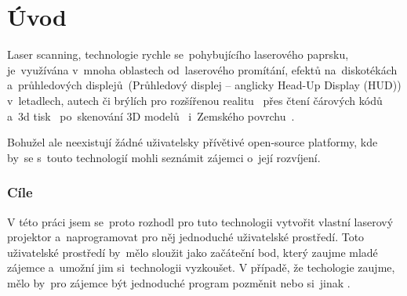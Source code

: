 \chapter*{Úvod}


Laser scanning, technologie rychle se~pohybujícího laserového paprsku, je~využívána v~mnoha oblastech od~laserového promítání, efektů na~diskotékách a~průhledových displejů~(Průhledový displej -- anglicky Head-Up Display (HUD)) v~letadlech, autech či brýlích pro rozšířenou realitu~\cite{laser-huds} přes čtení čárových kódů~\cite{history-of-barcode-scanning} a~3d tisk~\cite{Photo-curing-3D-printing} po~skenování 3D modelů~\cite{3d-model-scan} i~Zemského povrchu~\cite{heightmaps}.

Bohužel ale neexistují žádné uživatelsky přívětivé open-source platformy, kde by~se s~touto technologií mohli seznámit zájemci o~její rozvíjení.

\subsection*{Cíle}
V této práci jsem se~proto rozhodl pro tuto technologii vytvořit vlastní laserový projektor a~naprogramovat pro něj jednoduché uživatelské prostředí.
Toto uživatelské prostředí by~mělo sloužit jako začáteční bod, který zaujme mladé zájemce a~umožní jim si~technologii vyzkoušet.
V případě, že techologie zaujme, mělo by~pro zájemce být jednoduché program pozměnit nebo si~jinak .
